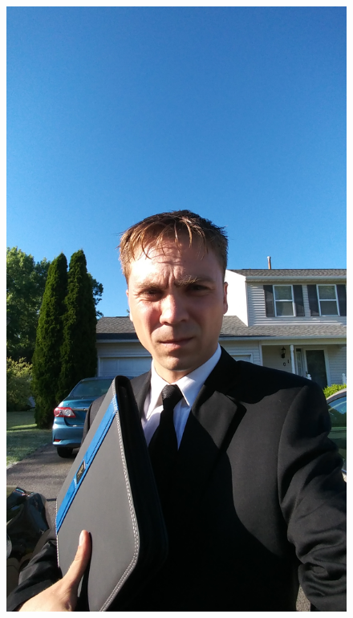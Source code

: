 \documentclass[10pt,A4]{article}
\begin{document}
\pagestyle{fancy}	


\vspace{-20.55pt}


\hspace{-0.25\linewidth}\colorbox{bgcol}{}



\begin{figure}[H]
\begin{flushright}
	\includegraphics[angle=90,trim= 800 250 800 250,clip,width=0.2\linewidth]{myphoto.jpg}	%
\end{flushright}
\end{figure}

\end{document}
